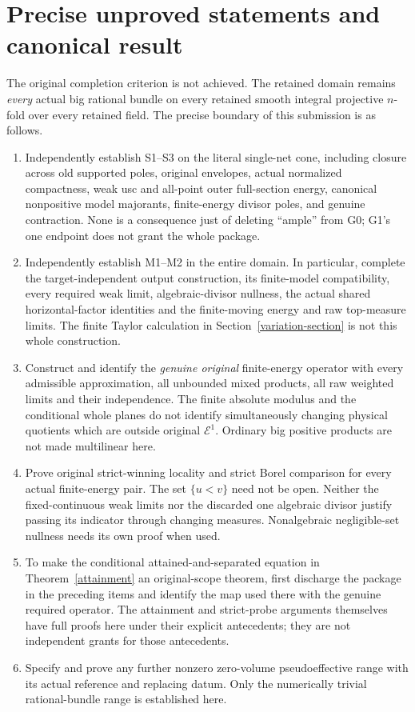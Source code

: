 \documentclass[10pt]{article}
\newcommand{\E}{\mathcal E}
\begin{document}
\section{Precise unproved statements and canonical result}\label{gaps}
The original completion criterion is not achieved. The retained domain
remains \emph{every} actual big rational bundle on every retained smooth
integral projective $n$-fold over every retained field. The precise boundary
of this submission is as follows.
\begin{enumerate}
\item Independently establish S1--S3 on the literal single-net cone,
including closure across old supported poles, original envelopes, actual
normalized compactness, weak usc and all-point outer full-section energy,
canonical nonpositive model majorants, finite-energy divisor poles, and
genuine contraction. None is a consequence just of deleting ``ample''
from G0; G1's one endpoint does not grant the whole package.
\item Independently establish M1--M2 in the entire domain. In particular,
complete the target-independent output construction, its finite-model
compatibility, every required weak limit, algebraic-divisor nullness,
the actual shared horizontal-factor identities and the finite-moving
energy and raw top-measure limits. The finite Taylor calculation in
Section~\ref{variation-section} is not this whole construction.
\item Construct and identify the \emph{genuine original} finite-energy
operator with every admissible approximation, all unbounded mixed
products, all raw weighted limits and their independence. The finite
absolute modulus and the conditional whole planes do not identify
simultaneously changing physical quotients which are outside original
$\E^1$. Ordinary big positive products are not made multilinear here.
\item Prove original strict-winning locality and strict Borel comparison
for every actual finite-energy pair. The set $\{u<v\}$ need not be
open. Neither the fixed-continuous weak limits nor the discarded one
algebraic divisor justify passing its indicator through changing measures.
Nonalgebraic negligible-set nullness needs its own proof when used.
\item To make the conditional attained-and-separated equation in
Theorem~\ref{attainment} an original-scope theorem, first discharge
the package in the preceding items and identify the map used there
with the genuine required operator. The attainment and strict-probe
arguments themselves have full proofs here under their explicit
antecedents; they are not independent grants for those antecedents.
\item Specify and prove any further nonzero zero-volume pseudoeffective
range with its actual reference and replacing datum. Only the
numerically trivial rational-bundle range is established here.
\end{enumerate}
\end{document}
